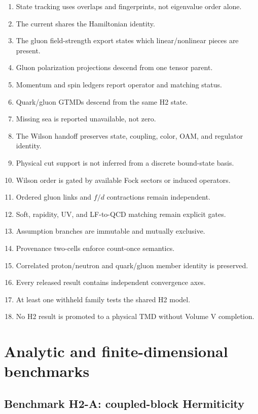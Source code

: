 \documentclass[11pt]{article}
\begin{document}
\begin{enumerate}[label=\textbf{V9.\arabic*.}]
 \item State tracking uses overlaps and fingerprints, not eigenvalue order
 alone.
 \item The current shares the Hamiltonian identity.
 \item The gluon field-strength export states which linear/nonlinear pieces are
 present.
 \item Gluon polarization projections descend from one tensor parent.
 \item Momentum and spin ledgers report operator and matching status.
 \item Quark/gluon GTMDs descend from the same H2 state.
 \item Missing sea is reported unavailable, not zero.
 \item The Wilson handoff preserves state, coupling, color, OAM, and regulator
 identity.
 \item Physical cut support is not inferred from a discrete bound-state basis.
 \item Wilson order is gated by available Fock sectors or induced operators.
 \item Ordered gluon links and \(f/d\) contractions remain independent.
 \item Soft, rapidity, UV, and LF-to-QCD matching remain explicit gates.
 \item Assumption branches are immutable and mutually exclusive.
 \item Provenance two-cells enforce count-once semantics.
 \item Correlated proton/neutron and quark/gluon member identity is preserved.
 \item Every released result contains independent convergence axes.
 \item At least one withheld family tests the shared H2 model.
 \item No H2 result is promoted to a physical TMD without Volume V completion.
\end{enumerate}

\section{Analytic and finite-dimensional benchmarks}

\subsection{Benchmark H2-A: coupled-block Hermiticity}
\end{document}
